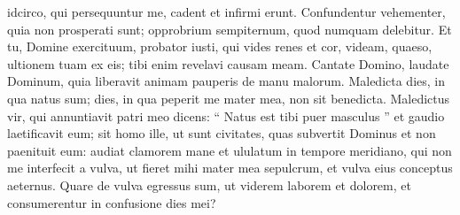 \begin{biblechapter}
\begin{biblechapter}
\begin{biblechapter}
\begin{biblechapter}
\begin{biblechapter}
\begin{biblechapter}
\begin{biblechapter}
\begin{biblechapter}
\begin{biblechapter}
\begin{biblechapter}
\begin{biblechapter}
\begin{biblechapter}
\begin{biblechapter}
\begin{biblechapter}
\begin{biblechapter}
\begin{biblechapter}
\begin{biblechapter}
\begin{biblechapter}
\begin{biblechapter}
\begin{biblechapter}
 idcirco, qui persequuntur me,
 cadent et infirmi erunt.
 Confundentur vehementer, quia non prosperati sunt;
 opprobrium sempiternum, quod numquam delebitur.
 \verse Et tu, Domine exercituum,
 probator iusti, qui vides renes et cor,
 videam, quaeso, ultionem tuam ex eis;
 tibi enim revelavi causam meam.
 \verse Cantate Domino, laudate Dominum,
 quia liberavit animam pauperis
 de manu malorum.
 \verse Maledicta dies, in qua natus sum;
 dies, in qua peperit me mater mea,
 non sit benedicta.
 \verse Maledictus vir, qui annuntiavit patri meo
 dicens: “ Natus est tibi puer masculus ”
 et gaudio laetificavit eum;
 \verse sit homo ille, ut sunt civitates,
 quas subvertit Dominus
 et non paenituit eum:
 audiat clamorem mane
 et ululatum in tempore meridiano, 
\verse qui non me interfecit a vulva,
 ut fieret mihi mater mea sepulcrum,
 et vulva eius conceptus aeternus.
 \verse Quare de vulva egressus sum,
 ut viderem laborem et dolorem,
 et consumerentur in confusione dies mei?
 

\end{biblechapter}
\end{biblechapter}
\end{biblechapter}
\end{biblechapter}
\end{biblechapter}
\end{biblechapter}
\end{biblechapter}
\end{biblechapter}
\end{biblechapter}
\end{biblechapter}
\end{biblechapter}
\end{biblechapter}
\end{biblechapter}
\end{biblechapter}
\end{biblechapter}
\end{biblechapter}
\end{biblechapter}
\end{biblechapter}
\end{biblechapter}
\end{biblechapter}
